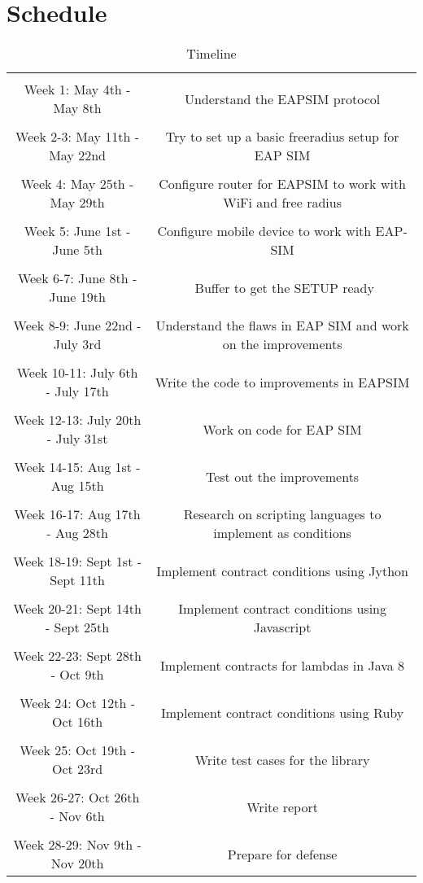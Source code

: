 \documentclass{article}
\begin{document}
\section{Schedule}
\label{sec:Section 3}
\begin{table}[ht]
\caption{Timeline}
\centering 
\begin{tabular}{c c}
\hline \hline   
\\               
Week 1: May 4th - May 8th  & Understand the EAP­SIM protocol\\
\\
Week 2-3: May 11th - May 22nd  & Try to set up a basic freeradius setup for EAP SIM\\
\\
Week 4: May 25th - May 29th & Configure router for EAP­SIM to work with WiFi and free radius \\
\\
Week 5: June 1st - June 5th  & Configure mobile device to work with EAP­SIM \\
\\
Week 6-7: June 8th - June 19th  & ­ Buffer to get the SETUP ready\\
\\
Week 8-9: June 22nd - July 3rd & Understand the flaws in EAP SIM and work on the improvements \\
\\
Week 10-11: July 6th - July 17th  & Write the code to improvements in EAP­SIM\\ 
\\
Week 12-13: July 20th - July 31st & Work on code for EAP SIM \\
\\
Week 14-15: Aug 1st - Aug 15th  & Test out the improvements\\
\\
Week 16-17: Aug 17th - Aug 28th & Research on scripting languages to implement as conditions \\
\\
Week 18-19: Sept 1st - Sept 11th  & Implement contract conditions using Jython\\
\\
Week 20-21: Sept 14th - Sept 25th  & Implement contract conditions using Javascript\\
\\
Week 22-23: Sept 28th - Oct 9th & Implement contracts for lambdas in Java 8\\
\\
Week 24: Oct 12th - Oct 16th  & Implement contract conditions using Ruby\\
\\
Week 25: Oct 19th - Oct 23rd & Write test cases for the library\\
\\
Week 26-27: Oct 26th - Nov 6th & Write report\\
\\
Week 28-29: Nov 9th - Nov 20th  & Prepare for defense\\
\hline
\end{tabular}
\label{table:nonlin}
\end{table}
\clearpage


\end{document}
